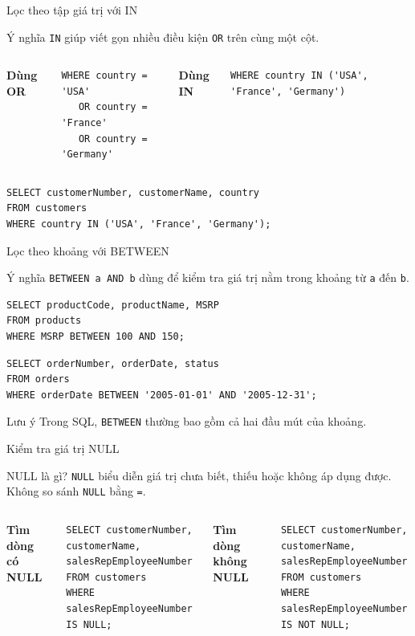 \documentclass[aspectratio=169,11pt]{beamer}
\newcommand{\kw}[1]{\textcolor{sqlblue}{\texttt{#1}}}
\newcommand{\minihead}[1]{\vspace{2pt}\textbf{#1}\vspace{2pt}}
\begin{document}
\begin{frame}[fragile]{Lọc theo tập giá trị với IN}
\begin{block}{Ý nghĩa}
\kw{IN} giúp viết gọn nhiều điều kiện \kw{OR} trên cùng một cột.
\end{block}
\begin{columns}[T]
\minihead{Dùng OR}
\begin{lstlisting}
WHERE country = 'USA'
   OR country = 'France'
   OR country = 'Germany'
\end{lstlisting}
\minihead{Dùng IN}
\begin{lstlisting}
WHERE country IN ('USA', 'France', 'Germany')
\end{lstlisting}
\end{columns}
\vspace{4pt}
\begin{lstlisting}
SELECT customerNumber, customerName, country
FROM customers
WHERE country IN ('USA', 'France', 'Germany');
\end{lstlisting}
\end{frame}

\begin{frame}[fragile]{Lọc theo khoảng với BETWEEN}
\begin{block}{Ý nghĩa}
\kw{BETWEEN a AND b} dùng để kiểm tra giá trị nằm trong khoảng từ \texttt{a} đến \texttt{b}.
\end{block}
\begin{lstlisting}
SELECT productCode, productName, MSRP
FROM products
WHERE MSRP BETWEEN 100 AND 150;
\end{lstlisting}
\begin{lstlisting}
SELECT orderNumber, orderDate, status
FROM orders
WHERE orderDate BETWEEN '2005-01-01' AND '2005-12-31';
\end{lstlisting}
\begin{alertblock}{Lưu ý}
Trong SQL, \kw{BETWEEN} thường bao gồm cả hai đầu mút của khoảng.
\end{alertblock}
\end{frame}

\begin{frame}[fragile]{Kiểm tra giá trị NULL}
\begin{block}{NULL là gì?}
\kw{NULL} biểu diễn giá trị chưa biết, thiếu hoặc không áp dụng được. Không so sánh \kw{NULL} bằng \texttt{=}.
\end{block}
\begin{columns}[T]
\minihead{Tìm dòng có NULL}
\begin{lstlisting}
SELECT customerNumber, customerName, salesRepEmployeeNumber
FROM customers
WHERE salesRepEmployeeNumber IS NULL;
\end{lstlisting}
\minihead{Tìm dòng không NULL}
\begin{lstlisting}
SELECT customerNumber, customerName, salesRepEmployeeNumber
FROM customers
WHERE salesRepEmployeeNumber IS NOT NULL;
\end{lstlisting}
\end{columns}
\end{frame}
\end{document}
